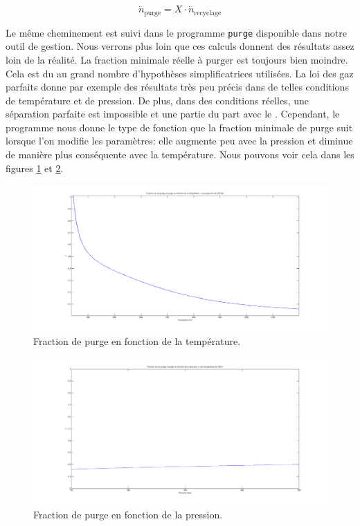 \begin{equation}
\dot{n}_{\text{purge}} = X \cdot \dot{n}_{\text{recyclage}}
\end{equation}

Le même cheminement est suivi dans le programme \texttt{purge} 
disponible dans notre outil de gestion. Nous verrons plus loin que ces calculs donnent
des résultats assez loin de la réalité. La fraction minimale réelle à purger est toujours
bien moindre. Cela est du au grand nombre d'hypothèses simplificatrices utilisées. 
La loi des gaz parfaits donne par exemple des résultats très peu précis 
dans de telles conditions de température et de pression. 
De plus, dans des conditions réelles, une séparation parfaite est impossible 
et une partie du  part avec le .
Cependant, le programme nous donne le type de fonction que la fraction minimale de purge
suit lorsque l'on modifie les paramètres: elle augmente peu avec la pression et diminue
de manière plus conséquente avec la température. Nous pouvons voir cela dans les figures
\ref{fig:purge1} et \ref{fig:purge2}.

\begin{figure}[h!]
	\begin{center}
		\includegraphics[scale=0.3]{../tache2/img/purge1.png}
	\end{center}
	\caption{Fraction de purge en fonction de la température.}
	\label{fig:purge1}
\end{figure}

\begin{figure}[h!]
	\begin{center}
		\includegraphics[scale=0.3]{../tache2/img/purge2.png}
	\end{center}
	\caption{Fraction de purge en fonction de la pression.}
	\label{fig:purge2}
\end{figure}


